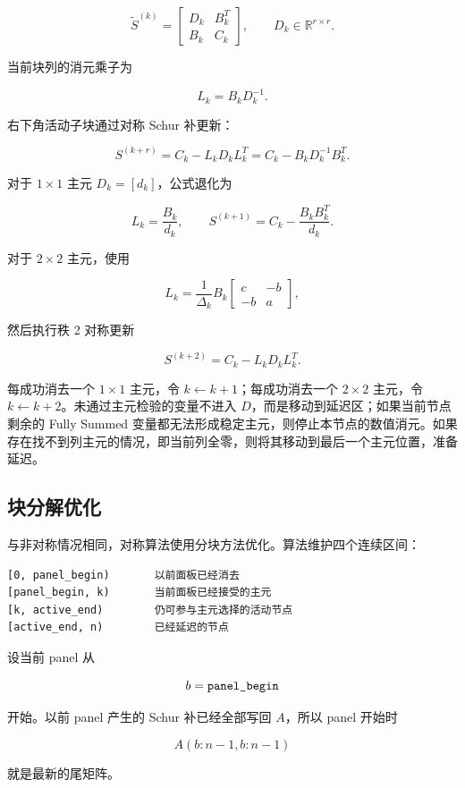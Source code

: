 \[
\widetilde S^{(k)}
=
\begin{bmatrix}
D_k&B_k^T\\
B_k&C_k
\end{bmatrix},
\qquad
D_k\in\mathbb R^{r\times r}.
\]

当前块列的消元乘子为

\[
L_k=B_kD_k^{-1}.
\]

右下角活动子块通过对称 Schur 补更新：

\[
S^{(k+r)}
=C_k-L_kD_kL_k^T
=C_k-B_kD_k^{-1}B_k^T.
\]

对于 $1\times1$ 主元 $D_k=[d_k]$，公式退化为

\[
L_k=\frac{B_k}{d_k},
\qquad
S^{(k+1)}=C_k-\frac{B_kB_k^T}{d_k}.
\]

对于 $2\times2$ 主元，使用

\[
L_k=
\frac{1}{\Delta_k}
B_k
\begin{bmatrix}
c&-b\\
-b&a
\end{bmatrix},
\]

然后执行秩 2 对称更新

\[
S^{(k+2)}=C_k-L_kD_kL_k^T.
\]

每成功消去一个 $1\times1$ 主元，令 $k\leftarrow k+1$；每成功消去一个 $2\times2$ 主元，令 $k\leftarrow k+2$。未通过主元检验的变量不进入 $D$，而是移动到延迟区；如果当前节点剩余的 Fully Summed 变量都无法形成稳定主元，则停止本节点的数值消元。如果存在找不到列主元的情况，即当前列全零，则将其移动到最后一个主元位置，准备延迟。

\subsection{块分解优化}

与非对称情况相同，对称算法使用分块方法优化。算法维护四个连续区间：

\begin{lstlisting}
[0, panel_begin)       以前面板已经消去
[panel_begin, k)       当前面板已经接受的主元
[k, active_end)        仍可参与主元选择的活动节点
[active_end, n)        已经延迟的节点
\end{lstlisting}

设当前 panel 从

\[
b=\texttt{panel\_begin}
\]

开始。以前 panel 产生的 Schur 补已经全部写回 $A$，所以 panel 开始时

\[
A(b:n-1,b:n-1)
\]

就是最新的尾矩阵。


